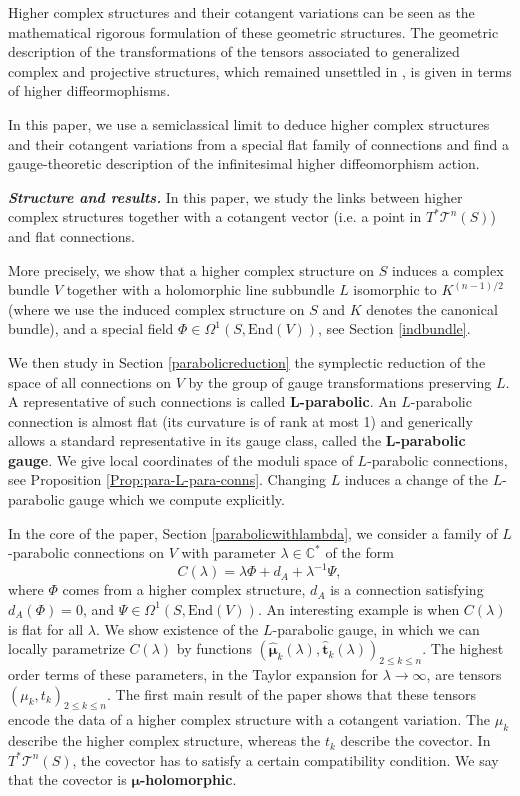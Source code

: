 \documentclass[11pt]{amsart}
\numberwithin{thm}{section} %
\numberwithin{equation}{section} %
\numberwithin{figure}{section} %
\newcommand*{\C}{\mathbb{C}}
\renewcommand*{\l}{\lambda}
\newcommand*{\mc}{\mathcal}
\newcommand*{\T}{\mc{T}}
\begin{document}
Higher complex structures and their cotangent variations can be seen as the mathematical rigorous formulation of these geometric structures. The geometric description of the transformations of the tensors associated to generalized complex and projective structures, which remained unsettled in \cite{BFK}, is given in terms of higher diffeormophisms.

In this paper, we use a semiclassical limit to deduce higher complex structures and their cotangent variations from a special flat family of connections and find a gauge-theoretic description of the infinitesimal higher diffeomorphism action.

\bigskip
\noindent \textbf{\textit{Structure and results.}}
In this paper, we study the links between higher complex structures together with a cotangent vector (i.e. a point in $T^*\T^n(S)$) and flat connections.

More precisely, we show that a higher complex structure on $S$ induces a complex bundle $V$ together with a holomorphic line subbundle $L$ isomorphic to $K^{(n-1)/2}$ (where we use the induced complex structure on $S$ and $K$ denotes the canonical bundle), and a special field $\Phi\in\Omega^1(S,\mathrm{End}(V))$, see Section \ref{indbundle}.

We then study in Section \ref{parabolicreduction} the symplectic reduction of the space of all connections on $V$ by the group of gauge transformations preserving $L$. A representative of such connections is called $\mathbf{L}$\textbf{-parabolic}. An $L$-parabolic connection is almost flat (its curvature is of rank at most 1) and generically allows a standard representative in its gauge class, called the $\mathbf{L}$\textbf{-parabolic gauge}. We give local coordinates of the moduli space of $L$-parabolic connections, see Proposition \ref{Prop:para-L-para-conns}. Changing $L$ induces a change of the $L$-parabolic gauge which we compute explicitly.

In the core of the paper, Section \ref{parabolicwithlambda}, we consider a family of $L$-parabolic connections on $V$ with parameter $\l\in\C^*$ of the form 
\begin{equation}\label{Eq:C-intro}
C(\l)=\l\Phi+d_A+\l^{-1}\Psi,
\end{equation}
where $\Phi$ comes from a higher complex structure, $d_A$ is a connection satisfying $d_A(\Phi)=0$, and $\Psi\in\Omega^1(S,\mathrm{End}(V))$. An interesting example is when $C(\l)$ is flat for all $\l$.
We show existence of the $L$-parabolic gauge, in which we can locally parametrize $C(\l)$ by functions $(\bm\hat{\mu}_k(\l),\bm\hat{t}_k(\l))_{2\leq k\leq n}$. The highest order terms of these parameters, in the Taylor expansion for $\l\to\infty$, are tensors $(\mu_k,t_k)_{2\leq k\leq n}$. The first main result of the paper shows that these tensors encode the data of a higher complex structure with a cotangent variation. The $\mu_k$ describe the higher complex structure, whereas the $t_k$ describe the covector. In $T^*\T^n(S)$, the covector has to satisfy a certain compatibility condition. We say that the covector is $\boldsymbol{\mu}$\textbf{-holomorphic}. 
\end{document}

